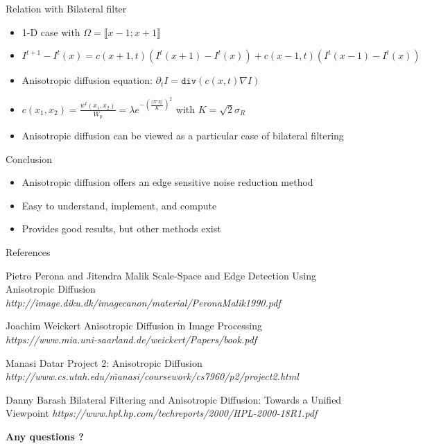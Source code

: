 \documentclass[aspectratio=169,xcolor=dvipsnames]{beamer}
\begin{document}
\begin{frame}{Relation with Bilateral filter}
\begin{itemize}
    \item 1-D case with $\Omega = \llbracket x-1;x+1\rrbracket$
    \pause
    \item $I^{t+1} - I^t(x) = c(x+1,t)(I^t(x+1) - I^t(x)) + c(x-1,t)(I^t(x-1) - I^t(x))$
    \pause
    \item Anisotropic diffusion equation: $\partial_t I =  \texttt{div} (c(x,t)\nabla I)$
    \pause
    \item $c(x_1,x_2)= \frac{w^t(x_1,x_2)}{W_p}=\lambda e^{-\left(\frac{||\nabla I||}{K}\right)^2}$ with $K = \sqrt{2}\sigma_R$
    \pause
    \item Anisotropic diffusion can be viewed as a particular case of bilateral filtering
\end{itemize}
    
\end{frame}

\begin{frame}{Conclusion}
    \begin{itemize}
        \item Anisotropic diffusion offers an edge sensitive noise reduction method 
        \pause
        \item Easy to understand, implement, and compute
        \pause
        \item Provides good results, but other methods exist 
    \end{itemize}
\end{frame}

\begin{frame}{References}
    \footnotesize{
        \begin{thebibliography}{99}
             Pietro Perona and Jitendra Malik
            \newblock Scale-Space and Edge Detection Using Anisotropic Diffusion
            \newblock \emph{http://image.diku.dk/imagecanon/material/PeronaMalik1990.pdf}
        \end{thebibliography}
        \begin{thebibliography}{99}
             Joachim Weickert
            \newblock Anisotropic Diffusion in Image Processing
            \newblock \emph{https://www.mia.uni-saarland.de/weickert/Papers/book.pdf}
        \end{thebibliography}
        \begin{thebibliography}{99}
             Manasi Datar
            \newblock Project 2: Anisotropic Diffusion
            \newblock \emph{http://www.cs.utah.edu/\~manasi/coursework/cs7960/p2/project2.html}
        \end{thebibliography}
        \begin{thebibliography}{99}
             Danny Barash
            \newblock Bilateral Filtering and Anisotropic Diffusion: Towards a Unified Viewpoint
            \newblock \emph{https://www.hpl.hp.com/techreports/2000/HPL-2000-18R1.pdf}
        \end{thebibliography}
    }
\end{frame}

\begin{frame}
    \Huge{\centerline{\textbf{Any questions ?}}}
\end{frame}
\end{document}
